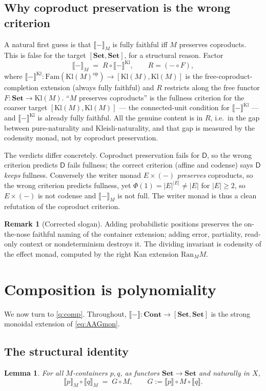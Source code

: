 \documentclass[11pt]{amsart}
\theoremstyle{plain}
\newtheorem{lemma}[theorem]{Lemma}
\theoremstyle{definition}
\newtheorem{remark}[theorem]{Remark}
\newcommand{\Set}{\mathbf{Set}}
\newcommand{\Cont}{\mathbf{Cont}}
\newcommand{\Fam}{\mathrm{Fam}}
\newcommand{\Kl}{\mathrm{Kl}}
\newcommand{\Ran}{\mathrm{Ran}}
\newcommand{\op}{\mathrm{op}}
\newcommand{\ext}[1]{\llbracket #1 \rrbracket}
\newcommand{\extM}[1]{\llbracket #1 \rrbracket_{M}}
\newcommand{\D}{\mathsf{D}}
\begin{document}
\subsection{Why coproduct preservation is the wrong criterion}\label{sec:correction}
A natural first guess is that $\extM{-}$ is fully faithful iff $M$ preserves coproducts. This is
false for the target $[\Set,\Set]$, for a structural reason. Factor
\[
  \extM{-}\;=\;R\circ\ext{-}^{\Kl},\qquad R=(-\circ F),
\]
where $\ext{-}^{\Kl}\colon\Fam(\Kl(M)^{\op})\to[\Kl(M),\Kl(M)]$ is the free-coproduct-completion
extension (always fully faithful) and $R$ restricts along the free functor $F\colon\Set\to\Kl(M)$.
``$M$ preserves coproducts'' is the fullness criterion for the coarser target
$[\Kl(M),\Kl(M)]$ --- the connected-unit condition for $\ext{-}^{\Kl}$ --- and $\ext{-}^{\Kl}$ is
already fully faithful. All the genuine content is in $R$, i.e.\ in the gap between pure-naturality
and Kleisli-naturality, and that gap is measured by the codensity monad, not by coproduct
preservation.

The verdicts differ concretely. Coproduct preservation fails for $\D$, so the wrong criterion
predicts $\D$ fails fullness; the correct criterion (affine and codense) says $\D$ \emph{keeps}
fullness. Conversely the writer monad $E\times(-)$ \emph{preserves} coproducts, so the wrong
criterion predicts fullness, yet $\Phi(1)=|E|^{|E|}\ne|E|$ for $|E|\ge2$, so $E\times(-)$ is not
codense and $\extM{-}$ is not full. The writer monad is thus a clean refutation of the coproduct
criterion.

\begin{remark}[Corrected slogan]
Adding probabilistic positions preserves the on-the-nose faithful naming of the container extension;
adding error, partiality, read-only context or nondeterminism destroys it. The dividing invariant is
codensity of the effect monad, computed by the right Kan extension $\Ran_M M$.
\end{remark}

\section{Composition is polynomiality}\label{sec:comp}

We now turn to \ref{q:comp}. Throughout, $\ext{-}\colon\Cont\to[\Set,\Set]$ is the strong monoidal
extension of \eqref{eq:AAGmon}.

\subsection{The structural identity}
\begin{lemma}\label{lem:A0}
For all $M$-containers $p,q$, as functors $\Set\to\Set$ and naturally in $X$,
\[
  \extM{p}\circ\extM{q}\;=\;G\circ M,\qquad G:=\ext{p}\circ M\circ\ext{q}.
\]
\end{lemma}
\end{document}
